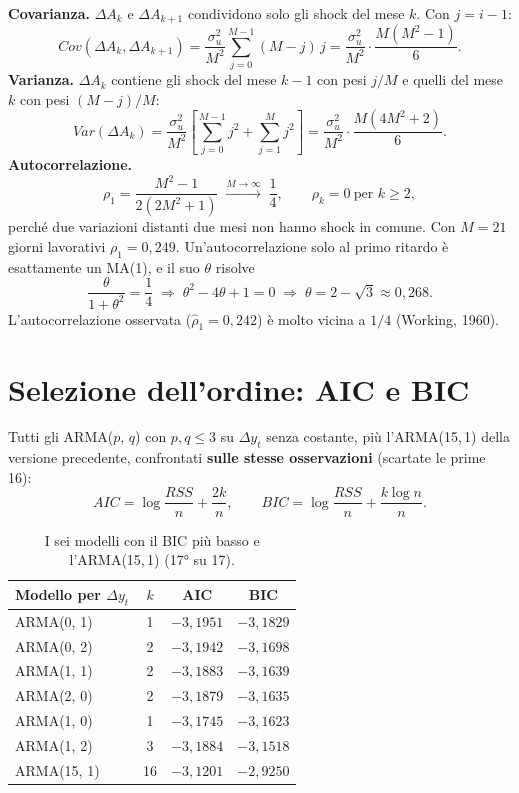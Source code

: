\documentclass[11pt,a4paper]{article}
\begin{document}
\textbf{Covarianza.} $\Delta A_k$ e $\Delta A_{k+1}$ condividono solo gli shock del mese $k$. Con $j = i - 1$:
\[
Cov(\Delta A_k, \Delta A_{k+1}) = \frac{\sigma_u^2}{M^2}\sum_{j=0}^{M-1} (M - j)\,j = \frac{\sigma_u^2}{M^2}\cdot\frac{M(M^2-1)}{6}.
\]
\textbf{Varianza.} $\Delta A_k$ contiene gli shock del mese $k-1$ con pesi $j/M$ e quelli del mese $k$ con pesi $(M-j)/M$:
\[
Var(\Delta A_k) = \frac{\sigma_u^2}{M^2}\left[\sum_{j=0}^{M-1} j^2 + \sum_{j=1}^{M} j^2\right] = \frac{\sigma_u^2}{M^2}\cdot\frac{M(4M^2+2)}{6}.
\]
\textbf{Autocorrelazione.}
\[
\rho_1 = \frac{M^2 - 1}{2(2M^2+1)} \;\xrightarrow{M\to\infty}\; \frac14, \qquad \rho_k = 0 \ \text{per } k \ge 2,
\]
perché due variazioni distanti due mesi non hanno shock in comune. Con $M = 21$ giorni lavorativi $\rho_1 = 0{,}249$. Un'autocorrelazione solo al primo ritardo è esattamente un MA(1), e il suo $\theta$ risolve
\[
\frac{\theta}{1+\theta^2} = \frac14 \;\Rightarrow\; \theta^2 - 4\theta + 1 = 0 \;\Rightarrow\; \theta = 2 - \sqrt3 \approx 0{,}268.
\]
L'autocorrelazione osservata ($\hat\rho_1 = 0{,}242$) è molto vicina a $1/4$ (Working, 1960).

\section{Selezione dell'ordine: AIC e BIC}

Tutti gli ARMA($p$, $q$) con $p, q \le 3$ su $\Delta y_t$ senza costante, più l'ARMA(15,\,1) della versione precedente, confrontati \textbf{sulle stesse osservazioni} (scartate le prime 16):
\[
AIC = \log\frac{RSS}{n} + \frac{2k}{n}, \qquad BIC = \log\frac{RSS}{n} + \frac{k\log n}{n}.
\]

\begin{table}[H]
\centering
\begin{tabular}{lccc}
\toprule
Modello per $\Delta y_t$ & $k$ & AIC & BIC \\
\midrule
ARMA(0, 1) & 1 & $-3{,}1951$ & $-3{,}1829$ \\
ARMA(0, 2) & 2 & $-3{,}1942$ & $-3{,}1698$ \\
ARMA(1, 1) & 2 & $-3{,}1883$ & $-3{,}1639$ \\
ARMA(2, 0) & 2 & $-3{,}1879$ & $-3{,}1635$ \\
ARMA(1, 0) & 1 & $-3{,}1745$ & $-3{,}1623$ \\
ARMA(1, 2) & 3 & $-3{,}1884$ & $-3{,}1518$ \\
\midrule
ARMA(15, 1) & 16 & $-3{,}1201$ & $-2{,}9250$ \\
\bottomrule
\end{tabular}
\caption{I sei modelli con il BIC più basso e l'ARMA(15,\,1) (17° su 17).}
\end{table}
\end{document}
